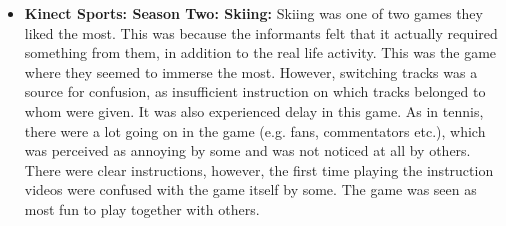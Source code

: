\begin{itemize}
\item \textbf{Kinect Sports: Season Two: Skiing:} Skiing was one of two games they liked the most. This was because the informants felt that it actually required something from them, in addition to the real life activity. This was the game where they seemed to immerse the most. However, switching tracks was a source for confusion, as insufficient instruction on which tracks belonged to whom were given. It was also experienced delay in this game. As in tennis, there were a lot going on in the game (e.g. fans, commentators etc.), which was perceived as annoying by some and was not noticed at all by others. There were clear instructions, however, the first time playing the instruction videos were confused with the game itself by some. The game was seen as most fun to play together with others. 
\end{itemize}

